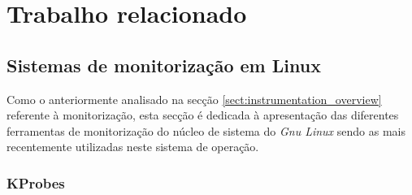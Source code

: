 \chapter{Trabalho relacionado}
\label{cap:trabrelacionado}

 
% 
% 



\section{Sistemas de monitorização em Linux}\label{sect:instrumentacao_casos_linux}

Como o anteriormente analisado na secção \ref{sect:instrumentation_overview} referente à monitorização, esta secção é dedicada à apresentação das diferentes ferramentas de monitorização do núcleo de sistema do \textit{Gnu Linux} sendo as mais recentemente utilizadas neste sistema de operação.

\subsection{KProbes}\label{sect:KProbes_overview}

